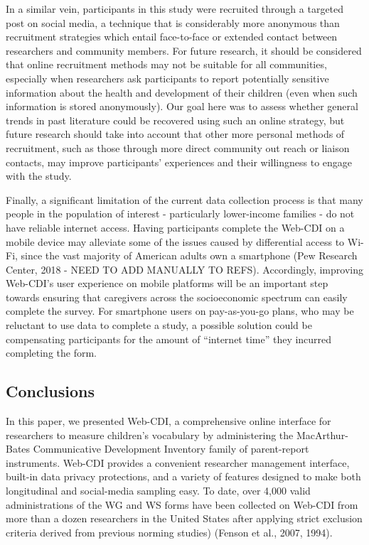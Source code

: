 \documentclass[
  english,
  man]{apa7}
\begin{document}
In a similar vein, participants in this study were recruited through a targeted post on social media, a technique that is considerably more anonymous than recruitment strategies which entail face-to-face or extended contact between researchers and community members. For future research, it should be considered that online recruitment methods may not be suitable for all communities, especially when researchers ask participants to report potentially sensitive information about the health and development of their children (even when such information is stored anonymously). Our goal here was to assess whether general trends in past literature could be recovered using such an online strategy, but future research should take into account that other more personal methods of recruitment, such as those through more direct community out reach or liaison contacts, may improve participants' experiences and their willingness to engage with the study.

Finally, a significant limitation of the current data collection process is that many people in the population of interest - particularly lower-income families - do not have reliable internet access. Having participants complete the Web-CDI on a mobile device may alleviate some of the issues caused by differential access to Wi-Fi, since the vast majority of American adults own a smartphone (Pew Research Center, 2018 - NEED TO ADD MANUALLY TO REFS). Accordingly, improving Web-CDI's user experience on mobile platforms will be an important step towards ensuring that caregivers across the socioeconomic spectrum can easily complete the survey. For smartphone users on pay-as-you-go plans, who may be reluctant to use data to complete a study, a possible solution could be compensating participants for the amount of \enquote{internet time} they incurred completing the form.

\hypertarget{conclusions}{%
\subsection{Conclusions}\label{conclusions}}

In this paper, we presented Web-CDI, a comprehensive online interface for researchers to measure children's vocabulary by administering the MacArthur-Bates Communicative Development Inventory family of parent-report instruments. Web-CDI provides a convenient researcher management interface, built-in data privacy protections, and a variety of features designed to make both longitudinal and social-media sampling easy. To date, over 4,000 valid administrations of the WG and WS forms have been collected on Web-CDI from more than a dozen researchers in the United States after applying strict exclusion criteria derived from previous norming studies) (Fenson et al., 2007, 1994).
\end{document}
